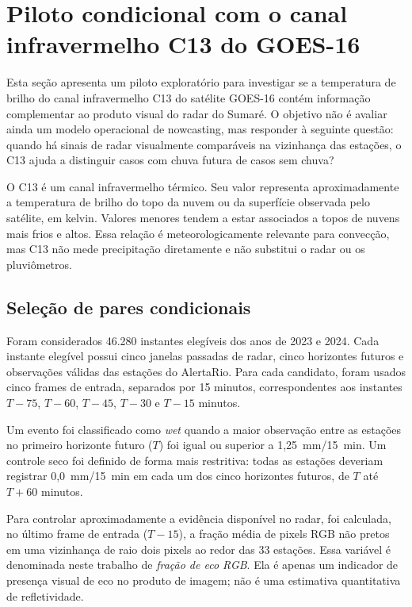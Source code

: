 
\section{Piloto condicional com o canal infravermelho C13 do GOES-16}
\label{sec:piloto-goes-c13-condicional}

Esta seção apresenta um piloto exploratório para investigar se a temperatura de brilho do canal infravermelho C13 do satélite GOES-16 contém informação complementar ao produto visual do radar do Sumaré. O objetivo não é avaliar ainda um modelo operacional de nowcasting, mas responder à seguinte questão: quando há sinais de radar visualmente comparáveis na vizinhança das estações, o C13 ajuda a distinguir casos com chuva futura de casos sem chuva?

O C13 é um canal infravermelho térmico. Seu valor representa aproximadamente a temperatura de brilho do topo da nuvem ou da superfície observada pelo satélite, em kelvin. Valores menores tendem a estar associados a topos de nuvens mais frios e altos. Essa relação é meteorologicamente relevante para convecção, mas C13 não mede precipitação diretamente e não substitui o radar ou os pluviômetros.

\subsection{Seleção de pares condicionais}
\label{subsec:selecao-pares-c13}

Foram considerados 46.280 instantes elegíveis dos anos de 2023 e 2024. Cada instante elegível possui cinco janelas passadas de radar, cinco horizontes futuros e observações válidas das estações do AlertaRio. Para cada candidato, foram usados cinco frames de entrada, separados por 15 minutos, correspondentes aos instantes $T-75$, $T-60$, $T-45$, $T-30$ e $T-15$ minutos.

Um evento foi classificado como \textit{wet} quando a maior observação entre as estações no primeiro horizonte futuro ($T$) foi igual ou superior a 1,25~mm/15~min. Um controle seco foi definido de forma mais restritiva: todas as estações deveriam registrar 0,0~mm/15~min em cada um dos cinco horizontes futuros, de $T$ até $T+60$ minutos.

Para controlar aproximadamente a evidência disponível no radar, foi calculada, no último frame de entrada ($T-15$), a fração média de pixels RGB não pretos em uma vizinhança de raio dois pixels ao redor das 33 estações. Essa variável é denominada neste trabalho de \emph{fração de eco RGB}. Ela é apenas um indicador de presença visual de eco no produto de imagem; não é uma estimativa quantitativa de refletividade.

